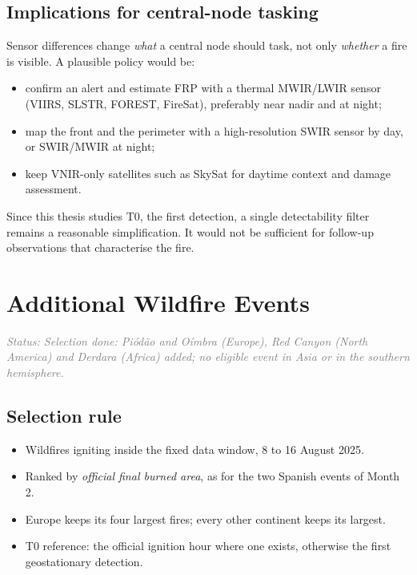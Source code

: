 \documentclass[11pt]{article}
\newcommand{\status}[1]{\textit{\textcolor{gray}{Status: #1}}}
\begin{document}
\subsection{Implications for central-node tasking}

Sensor differences change \emph{what} a central node should task, not only \emph{whether} a fire is visible. A plausible policy would be:
\begin{itemize}[leftmargin=1.2cm]
    \item confirm an alert and estimate FRP with a thermal MWIR/LWIR sensor (VIIRS, SLSTR, FOREST, FireSat), preferably near nadir and at night;
    \item map the front and the perimeter with a high-resolution SWIR sensor by day, or SWIR/MWIR at night;
    \item keep VNIR-only satellites such as SkySat for daytime context and damage assessment.
\end{itemize}
Since this thesis studies T0, the first detection, a single detectability filter remains a reasonable simplification. It would not be sufficient for follow-up observations that characterise the fire.

\section{Additional Wildfire Events}\label{sec:newevents}

\status{Selection done: Pi\'od\~ao and O\'imbra (Europe), Red Canyon (North America) and Derdara (Africa) added; no eligible event in Asia or in the southern hemisphere.}

\subsection{Selection rule}

\begin{itemize}[leftmargin=1.2cm]
    \item Wildfires igniting inside the fixed data window, 8 to 16 August 2025.
    \item Ranked by \emph{official final burned area}, as for the two Spanish events of Month 2.
    \item Europe keeps its four largest fires; every other continent keeps its largest.
    \item T0 reference: the official ignition hour where one exists, otherwise the first geostationary detection.
\end{itemize}
\end{document}
